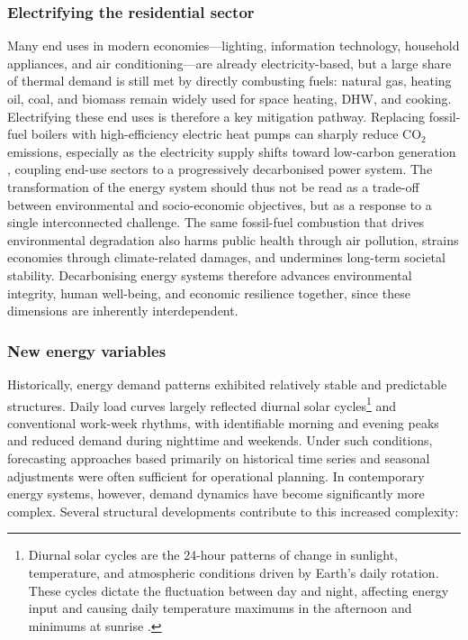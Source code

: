 \subsubsection*{Electrifying the residential sector}
Many end uses in modern economies—lighting, information technology, household appliances, and air conditioning—are already electricity-based, but a large share of thermal demand is still met by directly combusting fuels: natural gas, heating oil, coal, and biomass remain widely used for space heating, DHW, and cooking. Electrifying these end uses is therefore a key mitigation pathway. Replacing fossil-fuel boilers with high-efficiency electric heat pumps can sharply reduce CO$_2$ emissions, especially as the electricity supply shifts toward low-carbon generation \cite{BelgiumCountriesRegions}, coupling end-use sectors to a progressively decarbonised power system.
\newline The transformation of the energy system should thus not be read as a trade-off between environmental and socio-economic objectives, but as a response to a single interconnected challenge. The same fossil-fuel combustion that drives environmental degradation also harms public health through air pollution, strains economies through climate-related damages, and undermines long-term societal stability. Decarbonising energy systems therefore advances environmental integrity, human well-being, and economic resilience together, since these dimensions are inherently interdependent.

\subsubsection*{New energy variables}
Historically, energy demand patterns exhibited relatively stable and predictable structures. Daily load curves largely reflected diurnal solar cycles\footnote{Diurnal solar cycles are the 24-hour patterns of change in sunlight, temperature, and atmospheric conditions driven by Earth's daily rotation. These cycles dictate the fluctuation between day and night, affecting energy input and causing daily temperature maximums in the afternoon and minimums at sunrise \cite{DiurnalCycle2025}.} and conventional work-week rhythms, with identifiable morning and evening peaks and reduced demand during nighttime and weekends. Under such conditions, forecasting approaches based primarily on historical time series and seasonal adjustments were often sufficient for operational planning.
\newline In contemporary energy systems, however, demand dynamics have become significantly more complex. Several structural developments contribute to this increased complexity:

